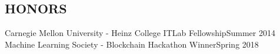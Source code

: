 \documentclass[margin]{res}
\begin{document}
\begin{resume}
\section{HONORS}
Carnegie Mellon University - Heinz College ITLab Fellowship\hfill Summer 2014\\
Machine Learning Society - Blockchain Hackathon Winner\hfill Spring 2018

\end{resume}
\end{document}
